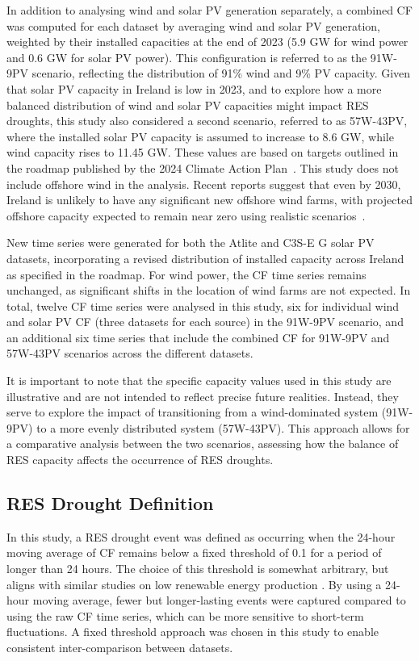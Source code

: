 \documentclass[preprint, 12pt]{elsarticle}
\begin{document}
In addition to analysing wind and solar PV generation separately, a combined CF was computed for each dataset by averaging wind and solar PV generation, weighted by their installed capacities at the end of 2023 (5.9 GW for wind power and 0.6 GW for solar PV power). This configuration is referred to as the 91W-9PV scenario, reflecting the distribution of 91\% wind and 9\% PV capacity. Given that solar PV capacity in Ireland is low in 2023, and to explore how a more balanced distribution of wind and solar PV capacities might impact RES droughts, this study also considered a second scenario, referred to as 57W-43PV, where the installed solar PV capacity is assumed to increase to 8.6 GW, while wind capacity rises to 11.45 GW. These values are based on targets outlined in the roadmap published by the 2024 Climate Action Plan~\citep{cap2024future}. This study does not include offshore wind in the analysis. Recent reports suggest that even by 2030, Ireland is unlikely to have any significant new offshore wind farms, with projected offshore capacity expected to remain near zero using realistic scenarios~\citep{seai2024future}.

New time series were generated for both the Atlite and C3S-E G solar PV datasets, incorporating a revised distribution of installed capacity across Ireland as specified in the roadmap. For wind power, the CF time series remains unchanged, as significant shifts in the location of wind farms are not expected. In total, twelve CF time series were analysed in this study, six for individual wind and solar PV CF (three datasets for each source) in the 91W-9PV scenario, and an additional six time series that include the combined CF for 91W-9PV and 57W-43PV scenarios across the different datasets.

It is important to note that the specific capacity values used in this study are illustrative and are not intended to reflect precise future realities. Instead, they serve to explore the impact of transitioning from a wind-dominated system (91W-9PV) to a more evenly distributed system (57W-43PV). This approach allows for a comparative analysis between the two scenarios, assessing how the balance of RES capacity affects the occurrence of RES droughts.

\subsection{RES Drought Definition}
\label{sec:res_drought}

In this study, a RES drought event was defined as occurring when the 24-hour moving average of CF remains below a fixed threshold of 0.1 for a period of longer than 24 hours. The choice of this threshold is somewhat arbitrary, but aligns with similar studies on low renewable energy production \citep{kaspar2019drought, ohba2022drought, mayer2023drought}. By using a 24-hour moving average, fewer but longer-lasting events were captured compared to using the raw CF time series, which can be more sensitive to short-term fluctuations. A fixed threshold approach was chosen in this study to enable consistent inter-comparison between datasets.
\end{document}
